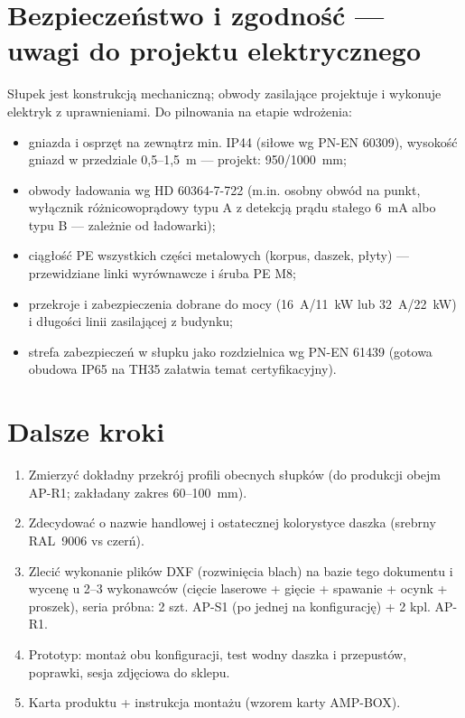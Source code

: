\documentclass[11pt,a4paper]{article}
\begin{document}
\section{Bezpieczeństwo i zgodność --- uwagi do projektu elektrycznego}
Słupek jest konstrukcją mechaniczną; obwody zasilające projektuje i wykonuje elektryk z uprawnieniami.
Do pilnowania na etapie wdrożenia:
\begin{itemize}
\item gniazda i osprzęt na zewnątrz min. IP44 (siłowe wg PN-EN 60309), wysokość gniazd w przedziale
0{,}5--1{,}5~m --- projekt: 950/1000~mm;
\item obwody ładowania wg HD 60364-7-722 (m.in. osobny obwód na punkt, wyłącznik różnicowoprądowy
typu A z detekcją prądu stałego 6~mA albo typu B --- zależnie od ładowarki);
\item ciągłość PE wszystkich części metalowych (korpus, daszek, płyty) --- przewidziane linki
wyrównawcze i śruba PE M8;
\item przekroje i zabezpieczenia dobrane do mocy (16~A/11~kW lub 32~A/22~kW) i długości linii
zasilającej z budynku;
\item strefa zabezpieczeń w słupku jako rozdzielnica wg PN-EN 61439 (gotowa obudowa IP65 na TH35
załatwia temat certyfikacyjny).
\end{itemize}

\section{Dalsze kroki}
\begin{enumerate}
\item Zmierzyć dokładny przekrój profili obecnych słupków (do produkcji obejm AP-R1; zakładany
zakres 60--100~mm).
\item Zdecydować o nazwie handlowej i ostatecznej kolorystyce daszka (srebrny RAL~9006 vs czerń).
\item Zlecić wykonanie plików DXF (rozwinięcia blach) na bazie tego dokumentu i wycenę u 2--3
wykonawców (cięcie laserowe + gięcie + spawanie + ocynk + proszek), seria próbna: 2 szt. AP-S1
(po jednej na konfigurację) + 2 kpl. AP-R1.
\item Prototyp: montaż obu konfiguracji, test wodny daszka i przepustów, poprawki, sesja zdjęciowa
do sklepu.
\item Karta produktu + instrukcja montażu (wzorem karty AMP-BOX).
\end{enumerate}
\end{document}
